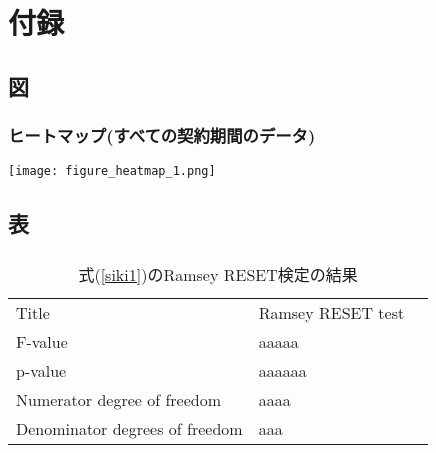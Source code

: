 \documentclass[../main]{subfiles}
\begin{document}
    \section*{付録}
    \setcounter{subsection}{0} %
    \renewcommand{\thesubsection}{\Alph{subsection}} %
    \setcounter{subsubsection}{0} %
    \renewcommand{\thesubsubsection}{\Alph{subsection}.\arabic{subsubsection}}
    \setcounter{equation}{0} %
    \renewcommand{\theequation}{\Alph{subsection}.\arabic{equation}}
    \setcounter{figure}{0} %
    \renewcommand{\thefigure}{\Alph{subsection}.\arabic{figure}}
    \setcounter{table}{0} %
    \renewcommand{\thetable}{\Alph{subsection}.\arabic{table}}

  
\subsection{図}
\subsubsection{ヒートマップ(すべての契約期間のデータ)}
\label{heatmap_all}
\texttt{[image: figure\_heatmap\_1.png]}\\

\clearpage

\subsection{表}

\subsubsection{   }
  \begin{table}[!htbp] \centering 
    \caption{式(\ref{siki1})のRamsey RESET検定の結果} 
    \label{hyob_spec1_reset} 
      \begin{tabular}{lll}
        Title                          &       Ramsey RESET test \\
        F-value                        &         aaaaa \\
        p-value                        &  aaaaaa \\
        Numerator degree of freedom    &                     aaaa \\
        Denominator degrees of freedom &                   aaa \\
        \end{tabular}
  \end{table} 
  
\end{document}
